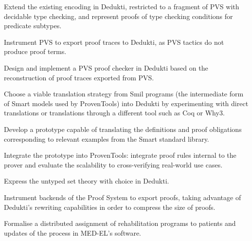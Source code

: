 \begin{workpackage}
\begin{tasklist}
\begin{task}[id=pvs,
  title=Express the theory of PVS in Dedukti,
  shorttitle=PVS,
  lead=Inr,   %
  InrRM=20,  %
  wphases=1-48,
  ]
  \vspace{-5mm}
  \begin{compactitem}
  \item Extend the existing encoding in Dedukti,
    restricted to a fragment of PVS with decidable type checking, and represent
    proofs of type checking conditions for predicate subtypes.
  \item Instrument PVS to export proof traces to Dedukti, as PVS 
    tactics do not produce proof terms.
  \item Design and implement a PVS proof checker in Dedukti based on the
    reconstruction of proof traces exported from PVS.
  \end{compactitem}
\end{task}

\begin{task}[id=smart,
  title=Express Smart models and proofs in Dedukti,
  shorttitle=Smart,
  lead=Pro,   %
  ProRM=11,
  wphases=1-48,
  ]
  \vspace{-5mm}
  \begin{compactitem}
  \item Choose a viable translation strategy from Smil programs (the
    intermediate form of Smart models used by ProvenTools) into Dedukti
    by experimenting with direct translations or translations through a
    different tool such as Coq or Why3.
  \item Develop a prototype capable of translating the definitions and proof
    obligations corresponding to relevant examples from the Smart
    standard library.
  \item Integrate the prototype into ProvenTools: integrate proof rules internal
    to the prover and evaluate the scalability to cross-verifying real-world use
    cases.
  \end{compactitem}
\end{task}

\begin{task}[id=tla,
  title=Express the theory of \tlaplus in Dedukti,
  shorttitle=\tlaplus,
  lead=Inr,   %
  InrRM=21,   %
  MedRM=4,
  wphases=1-48,
  ]
  \vspace{-5mm}
  \begin{compactitem}
  \item Express the untyped \tlaplus set theory with choice in
    Dedukti.
  \item Instrument backends of the \tlaplus Proof System to export proofs,
    taking advantage of Dedukti's rewriting capabilities in order to compress
    the size of proofs.
  \item Formalise a distributed assignment of rehabilitation programs to
    patients and updates of the process in MED-EL's software.
  \end{compactitem}
\end{task}


\end{tasklist}
\end{workpackage}
